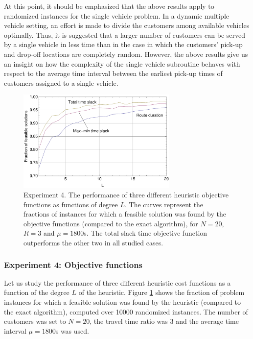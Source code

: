 \documentclass[dissertation,draft*]{aaltoseries}
\begin{document}
At this point, it should be emphasized that the above results apply to randomized instances for the 
single vehicle problem. In a dynamic multiple vehicle setting, an effort is made to 
divide the customers among available vehicles optimally. Thus, it is suggested that a larger number of customers
can be served by a single vehicle in less time than in the case in which the customers' pick-up
and drop-off locations are completely random. However, the above results give us an insight on
how the complexity of the single vehicle subroutine behaves with respect to the average time interval between
the earliest pick-up times of customers assigned to a single vehicle.


\begin{figure}[ht]
\begin{center}
\includegraphics[width=0.7\textwidth]{objvertailu01.pdf}
\caption{Experiment 4. The performance of three different heuristic objective functions as functions of degree $L$.
The curves represent the fractions of instances for which a feasible solution was found by the objective functions 
(compared to the exact algorithm), 
for $N=20$, $R=3$ and $\mu=1800$s. The total slack time objective function
outperforms the other two in all studied cases.
}
\label{objvertailu01}
\end{center}
\end{figure}



\subsubsection{Experiment 4: Objective functions}
Let us study the performance of three different heuristic cost functions %
as a function of the degree $L$ of the heuristic.
Figure \ref{objvertailu01} shows the fraction of problem instances for which a feasible solution was 
found by the heuristic (compared to the exact algorithm), computed over 10000
randomized instances. 
The number of customers was set to $N=20$, the travel time ratio
was $3$ and the average time interval $\mu = 1800$s was used.
\end{document}
